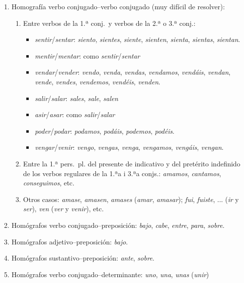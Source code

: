 {\begin{enumerate}
\item Homografía verbo conjugado--verbo conjugado (muy difícil de resolver): \begin{enumerate} \item Entre verbos de la 1.ª conj.\ y verbos de la 2.ª o 3.ª conj.: \begin{itemize} \item \emph{sentir}/\emph{sentar}: \emph{siento}, \emph{sientes}, {\em siente}, \emph{sienten}, \emph{sienta}, \emph{sientas}, \emph{ sientan}. \item \emph{mentir}/\emph{mentar}: como \emph{sentir}/\emph{sentar} \item \emph{vendar}/\emph{vender}: \emph{vendo}, \emph{venda}, {\em vendas}, \emph{vendamos}, \emph{vendáis}, \emph{vendan}, \emph{vende}, \emph{vendes}, \emph{vendemos}, \emph{vendéis}, {\em venden}. \item \emph{salir}/\emph{salar}: \emph{sales}, \emph{sale}, \emph{salen} \item \emph{asir}/\emph{asar}: como \emph{salir}/\emph{salar} \item \emph{poder}/\emph{podar}: \emph{podamos}, \emph{podáis}, {\em podemos}, \emph{podéis}. \item \emph{vengar}/\emph{venir}: \emph{vengo}, \emph{vengas}, {\em venga}, \emph{vengamos}, \emph{vengáis}, \emph{vengan}. \end{itemize} 

\item Entre la 1.ª pers.\ pl. del presente de indicativo y del pretérito indefinido de los verbos regulares de la 1.ªa i 3.ªa conjs.: {\em amamos}, \emph{cantamos}, \emph{conseguimos}, etc. \item Otros casos: \emph{amase}, \emph{amasen}, \emph{amases} ({\em amar}, \emph{amasar}); \emph{fui}, \emph{fuiste}, ... (\emph{ir} y \emph{ser}), \emph{ven} (\emph{ver} y \emph{venir}), etc. \end{enumerate} 

\item Homógrafos verbo conjugado--preposición: \emph{bajo}, {\em cabe}, \emph{entre}, \emph{para}, \emph{sobre}. 

\item Homógrafos adjetivo--preposición: \emph{bajo}. 

\item Homógrafos sustantivo--preposición: \emph{ante}, \emph{sobre}. 

\item Homógrafos verbo conjugado--determinante: \emph{uno}, \emph{una}, \emph{unas} (\emph{unir}) 


\end{enumerate}}
